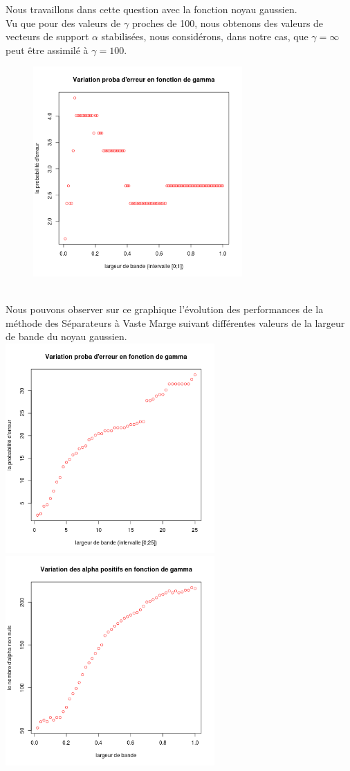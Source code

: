 \documentclass[a4paper, 10pt]{article}
\begin{document}
Nous travaillons dans cette question avec la fonction noyau gaussien.\\
Vu que pour des valeurs de $\gamma$ proches de 100, nous obtenons des valeurs de vecteurs de support $\alpha$ stabilisées,
nous considérons, dans notre cas, que $\gamma = \infty$ peut être assimilé à $\gamma = 100$.
\begin{figure}[h!]
	\centering
\includegraphics[height = 8cm, width = 8cm]{plots/ex4_q3_proba_erreur_gamma1.png}
\end{figure}\\
Nous pouvons observer sur ce graphique l'évolution des performances de la méthode des Séparateurs à Vaste Marge suivant différentes valeurs de la largeur de bande du noyau gaussien.\\
\includegraphics[height = 8cm, width = 8cm]{plots/ex4_q3_proba_erreur_gamma2.png}
\includegraphics[height = 8cm, width = 8cm]{plots/ex4_q3_alpha_positifs.png}\\ \\
\end{document}
